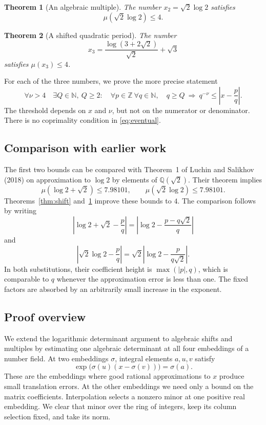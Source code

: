 \documentclass[11pt]{article}
\theoremstyle{definition}
\theoremstyle{remark}
\theoremstyle{plain}
\newtheorem{mainthm}{Theorem}
\newcommand{\Q}{\mathbb Q}
\newcommand{\Z}{\mathbb Z}
\newcommand{\N}{\mathbb N}
\begin{document}
\begin{mainthm}[An algebraic multiple]\label{thm:scale}
The number \(x_2=\sqrt2\log2\) satisfies
\[
 \mu(\sqrt2\log2)\le4.
\]
\end{mainthm}

\begin{mainthm}[A shifted quadratic period]\label{thm:period}
The number
\[
 x_3=\frac{\log(3+2\sqrt2)}{\sqrt2}+\sqrt3
\]
satisfies \(\mu(x_3)\le4\).
\end{mainthm}

For each of the three numbers, we prove the more precise statement
\begin{equation}\label{eq:eventual}
 \forall\nu>4\quad\exists Q\in\N,\ Q\ge2:\quad
 \forall p\in\Z\ \forall q\in\N,\quad
 q\ge Q\ \Longrightarrow\ q^{-\nu}\le\left|x-\frac pq\right|.
\end{equation}
The threshold depends on \(x\) and \(\nu\), but not on the numerator
or denominator. There is no coprimality condition in
\eqref{eq:eventual}.

\subsection{Comparison with earlier work}
The first two bounds can be compared with Theorem~1 of Luchin and
Salikhov~\cite{luchin} (2018) on approximation to \(\log2\) by elements
of \(\Q(\sqrt2)\). Their theorem implies
\[
 \mu(\log2+\sqrt2)\le7.98101,\qquad
 \mu(\sqrt2\log2)\le7.98101.
\]
Theorems~\ref{thm:shift} and~\ref{thm:scale} improve these bounds to
\(4\). The comparison follows by writing
\[
 \left|\log2+\sqrt2-\frac pq\right|
 =\left|\log2-\frac{p-q\sqrt2}{q}\right|
\]
and
\[
 \left|\sqrt2\log2-\frac pq\right|
 =\sqrt2\left|\log2-\frac{p}{q\sqrt2}\right|.
\]
In both substitutions, their coefficient height is \(\max(|p|,q)\),
which is comparable to \(q\) whenever the approximation error is less
than one. The fixed factors are absorbed by an arbitrarily small
increase in the exponent.

\subsection{Proof overview}
We extend the logarithmic determinant argument to algebraic shifts and
multiples by estimating one algebraic determinant at all four embeddings
of a number field.
At two embeddings \(\sigma\), integral elements \(a,u,v\) satisfy
\[
 \exp\bigl(\sigma(u)(x-\sigma(v))\bigr)=\sigma(a).
\]
These are the embeddings where good rational approximations to \(x\)
produce small translation errors. At the other embeddings we need only a
bound on the matrix coefficients. Interpolation selects a nonzero minor at
one positive real embedding. We clear that minor over the ring of integers,
keep its column selection fixed, and take its norm.
\end{document}

